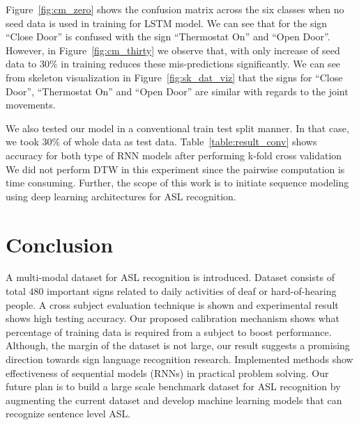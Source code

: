 \documentclass[10pt,twocolumn,letterpaper]{article}
\begin{document}
Figure~\ref{fig:cm_zero} shows the 
 confusion matrix  across the six classes when no seed data is used in training for LSTM model. We can see that for the 
 sign ``Close Door'' is confused with the sign ``Thermostat On'' and ``Open Door''. However, in Figure~\ref{fig:cm_thirty} we observe that, with only increase of seed data to $30\%$ in training  reduces these mis-predictions significantly. We can see from skeleton visualization in Figure~\ref{fig:sk_dat_viz} that the signs for 
 ``Close Door'', ``Thermostat On'' and ``Open Door'' are  similar with regards to the joint movements. 
 
 
We also tested our model in a  conventional train test split manner. In that case, we took $30\%$ of whole data as test data. Table~\ref{table:result_conv} shows accuracy for both type of RNN models after performing k-fold cross validation 
We did not perform DTW in this experiment since the pairwise computation is time consuming. Further, the scope of  this work is to initiate sequence modeling using deep learning architectures for ASL recognition.

 
\section{Conclusion}
A multi-modal dataset for ASL recognition is introduced. Dataset consists of total $480$ important signs related to daily activities of deaf or hard-of-hearing people. A cross subject evaluation technique is shown and experimental result shows high testing accuracy. Our proposed calibration mechanism shows what percentage of training data is required from a subject to boost performance. Although, the margin of the dataset is not large, our result suggests a promising direction towards sign language recognition research. Implemented methods show effectiveness of sequential models (RNNs) in practical problem solving. Our future plan is to build a large scale benchmark dataset for ASL recognition by augmenting the current dataset and develop machine learning models that can recognize sentence level ASL.




{\small


}
\end{document}
